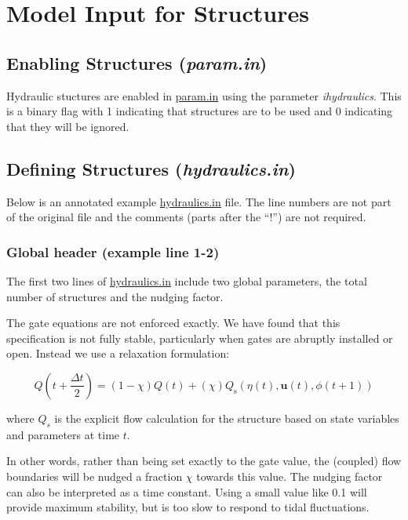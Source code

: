 


\section{Model Input for Structures}
\subsection{Enabling Structures ({\em param.in})}
Hydraulic stuctures are enabled in \url{param.in} using the parameter {\em ihydraulics}. This is a binary
flag with 1 indicating that structures are to be used and 0 indicating that they will be ignored.

\subsection{Defining Structures ({\em hydraulics.in})}
Below is an annotated example \url{hydraulics.in} file. The line numbers are not part of the original file
and the comments (parts after the "`!"') are not required.

\begin{samepage}

\end{samepage}
\subsubsection{Global header (example line 1-2)}
The first two lines of \url{hydraulics.in} include two global parameters, 
the total number of structures and the nudging factor.

The gate equations are not enforced exactly. We have found that this specification is not fully stable, particularly when gates
are abruptly installed or open. Instead we use a relaxation formulation:

$$Q(t+\frac{\Delta t}{2})= (1-\chi) Q(t) + (\chi) Q_{\text{s}}(\eta(t),\mathbf{u}(t),\phi(t+1))$$

where $Q_s$ is the explicit flow calculation for the structure based on state variables and parameters at time $t$.

In other words, rather than being set exactly to the gate value, the (coupled) flow boundaries will be nudged a fraction $\chi$ towards this value. 
The nudging factor can also be interpreted as a time constant. Using a small value like 0.1 will provide maximum stability, but is too slow
to respond to tidal fluctuations. 

